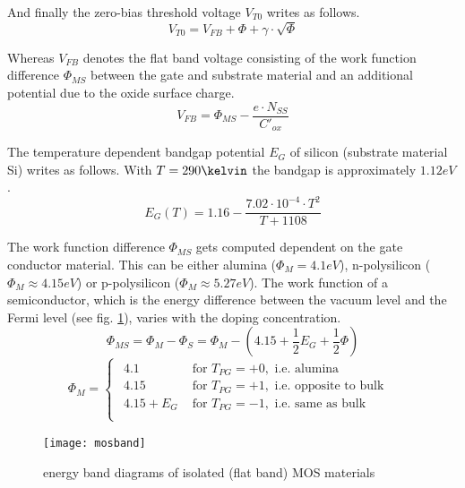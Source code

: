 \documentclass[10pt]{report}
\begin{document}
And finally the zero-bias threshold voltage $V_{T0}$ writes as
follows.
\begin{equation}
V_{T0} = V_{FB} + \Phi + \gamma\cdot\sqrt{\Phi}
\end{equation}

Whereas $V_{FB}$ denotes the flat band voltage consisting of the work
function difference $\Phi_{MS}$ between the gate and substrate
material and an additional potential due to the oxide surface charge.
\begin{equation}
V_{FB} = \Phi_{MS} - \dfrac{e\cdot N_{SS}}{C'_{ox}}
\end{equation}

The temperature dependent bandgap potential $E_{G}$ of silicon
(substrate material Si) writes as follows.  With $T = 290\kelvin$ the
bandgap is approximately $1.12eV$.
\begin{equation}
E_{G}\left(T\right) = 1.16 - \dfrac{7.02\cdot 10^{-4}\cdot T^2}{T + 1108}
\end{equation}

The work function difference $\Phi_{MS}$ gets computed dependent on
the gate conductor material.  This can be either alumina ($\Phi_{M} =
4.1eV$), n-polysilicon ($\Phi_{M} \approx 4.15eV$) or p-polysilicon
($\Phi_{M} \approx 5.27eV$).  The work function of a semiconductor,
which is the energy difference between the vacuum level and the Fermi
level (see fig. \ref{fig:mosband}), varies with the doping
concentration.
\begin{equation}
\Phi_{MS} = \Phi_{M} - \Phi_{S} = \Phi_{M} - \left(4.15 + \dfrac{1}{2}E_{G} + \dfrac{1}{2}\Phi\right)
\label{eq:workfunction}
\end{equation}
\begin{equation}
\Phi_{M} =
\begin{cases}
\begin{array}{ll}
4.1 & \textrm{ for } T_{PG} = +0, \textrm{ i.e. alumina}\\
4.15 & \textrm{ for } T_{PG} = +1, \textrm{ i.e. opposite to bulk }\\
4.15 + E_{G} & \textrm{ for } T_{PG} = -1, \textrm{ i.e. same as bulk }\\
\end{array}
\end{cases}
\end{equation}

\begin{figure}[ht]
\begin{center}
\texttt{[image: mosband]}
\end{center}
\caption{energy band diagrams of isolated (flat band) MOS materials}
\label{fig:mosband}
\end{figure}
\FloatBarrier
\end{document}
